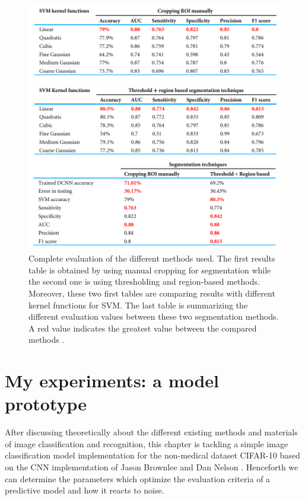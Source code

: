 \documentclass[11pt, openany]{report}
\theoremstyle{plain}
\theoremstyle{definition}
\theoremstyle{remark}
\begin{document}
\newpage
\hspace*{0mm}\vfill
\begin{figure}[H]
  \centering
  \includegraphics[scale=0.465]{figures/eval-article.png}
  \caption{Complete evaluation of the different methods used. The first results table is obtained by using manual cropping for segmentation while the second one is using thresholding and region-based methods. Moreover, these two first tables are comparing results with different kernel functions for SVM. The last table is summarizing the different evaluation values between these two segmentation methods. A red value indicates the greatest value between the compared methods \cite{breast-cancer}.}
  \label{fig:eval-article}
\end{figure}
\vfill\hspace*{0mm}


\chapter{My experiments: a model prototype} \label{chap:CIFAR10-exp}

After discussing theoretically about the different existing methods and materials of image classification and recognition, this chapter is tackling a simple image classification model implementation for the non-medical dataset CIFAR-10 \cite{CIFAR10} based on the CNN implementation of Jason Brownlee \cite{CIFAR10-implementation-1} and Dan Nelson \cite{CIFAR10-implementation-2}. Henceforth we can determine the parameters which optimize the evaluation criteria of a predictive model and how it reacts to noise. 
\end{document}
